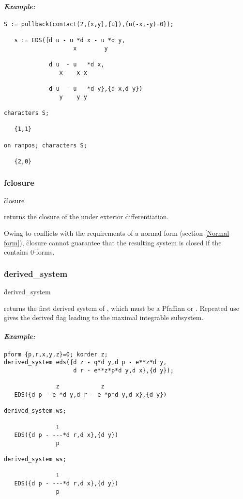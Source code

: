 \paragraph{\textit{Example:}}
\begin{verbatim}
S := pullback(contact(2,{x,y},{u}),{u(-x,-y)=0});

   s := EDS({d u - u *d x - u *d y,
                    x        y

             d u  - u   *d x,
                x    x x

             d u  - u   *d y},{d x,d y})
                y    y y

characters S;

   {1,1}

on ranpos; characters S;

   {2,0}
\end{verbatim}

\subsubsection{f{closure}}
\label{closure}

\hypertarget{operator:CLOSURE}{}
\begin{syntax}
	\f{closure} 
\end{syntax}
returns the closure of the  under exterior differentiation.

Owing to conflicts with the requirements of a normal form (section
\ref{Normal form}), \f{closure} cannot guarantee that the resulting system
is closed if the  contains 0-forms.

\subsubsection{\f{derived\_system}}
\label{derived_system}

\hypertarget{operator:DERIVED_SYSTEM}{}
\begin{syntax}
	\f{derived\_system} 
\end{syntax}
returns the first derived system of , which must be a Pfaffian
 or . Repeated use gives the derived flag leading to
the maximal integrable subsystem.

\paragraph{\textit{Example:}}
\begin{verbatim}
pform {p,r,x,y,z}=0; korder z;
derived_system eds({d z - q*d y,d p - e**z*d y,
                    d r - e**z*p*d y,d x},{d y});

               z            z
   EDS({d p - e *d y,d r - e *p*d y,d x},{d y})

derived_system ws;

               1
   EDS({d p - ---*d r,d x},{d y})
               p

derived_system ws;

               1
   EDS({d p - ---*d r,d x},{d y})
               p
\end{verbatim}

